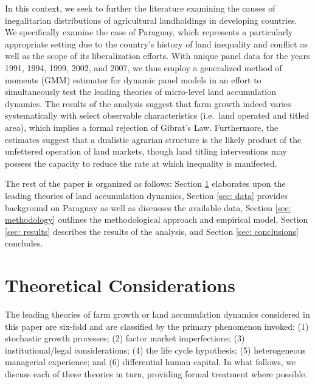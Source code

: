 \documentclass[english]{article}
\begin{document}
In this context, we seek to further the literature examining the causes of 
inegalitarian distributions of agricultural landholdings in developing 
countries.
We specifically examine the case of Paraguay, which represents a particularly 
appropriate setting due to the country's history of land inequality and conflict 
as well as the scope of its liberalization efforts.
With unique panel data for the years 1991, 1994, 1999, 2002, and 2007, we thus 
employ a generalized method of moments (GMM) estimator for dynamic panel 
models in an effort to simultaneously test the leading theories of micro-level 
land accumulation dynamics.
The results of the analysis suggest that farm growth indeed varies 
systematically with select observable characteristics 
(i.e.\ land operated and titled area), which implies a formal rejection of 
Gibrat's Law. 
Furthermore, the estimates suggest that a dualistic agrarian structure is the 
likely product of the unfettered operation of land markets, though land titling 
interventions may possess the capacity to reduce the rate at which inequality 
is manifested.

The rest of the paper is organized as follows: Section \ref{sec: theories} 
elaborates upon the leading theories of land accumulation dynamics, 
Section \ref{sec: data} provides background on Paraguay as well as discusses 
the available data, Section \ref{sec: methodology} outlines the methodological 
approach and empirical model, Section \ref{sec: results} describes the results 
of the analysis, and Section \ref{sec: conclusions} concludes.


\section{Theoretical Considerations}
\label{sec: theories}

The leading theories of farm growth or land accumulation dynamics 
considered in this paper are six-fold and are classified by the primary 
phenomenon invoked: (1) stochastic growth processes; (2) factor market 
imperfections; (3) institutional/legal considerations; (4) the life cycle 
hypothesis; (5) heterogeneous managerial experience; and (6) differential 
human capital. In what follows, we discuss each of these theories in turn, 
providing formal treatment where possible.
\end{document}

